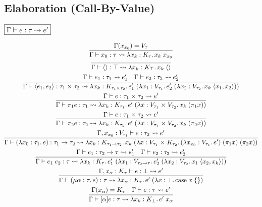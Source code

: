 \subsection{Elaboration (Call-By-Value)}

$\fbox{$\Gamma \vdash e: \tau \rightsquigarrow e'$}$

\begin{gather*}
  \infer{\Gamma \vdash x_0: \tau \elaborate \lambda x_k: K_\tau\ldotp x_k\; x_{x_0}}{
    \Gamma(x_{x_0}) = V_\tau
  }
  \\
  \infer{\Gamma \vdash \langle\rangle: \top \elaborate \lambda x_k: K_\top\ldotp x_k\; \langle\rangle}{}
  \\
  \infer{\Gamma \vdash \langle e_1, e_2\rangle: \tau_1 \multi \tau_2 \elaborate \lambda x_k: K_{\tau_1 \multi \tau_2}\ldotp e_1'\; (\lambda x_1: V_{\tau_1}\ldotp e_2'\; (\lambda x_2: V_{\tau_2}\ldotp x_k\; \langle x_1, x_2\rangle))}{
    \Gamma \vdash e_1: \tau_1 \elaborate e_1'
    &
    \Gamma \vdash e_2: \tau_2 \elaborate e_2'
  }
  \\
  \infer{\Gamma \vdash \pi_1 e: \tau_1 \elaborate \lambda x_k: K_{\tau_1}\ldotp e'\; (\lambda x: V_{\tau_1} \multi V_{\tau_2}\ldotp x_k\; (\pi_1 x))}{
    \Gamma \vdash e: \tau_1 \multi \tau_2 \elaborate e'
  }
  \\
  \infer{\Gamma \vdash \pi_2 e: \tau_2 \elaborate \lambda x_k: K_{\tau_2}\ldotp e'\; (\lambda x: V_{\tau_1} \multi V_{\tau_2}\ldotp x_k\; (\pi_2 x))}{
    \Gamma \vdash e: \tau_1 \multi \tau_2 \elaborate e'
  }
  \\
  \infer{\Gamma \vdash (\lambda x_0: \tau_1\ldotp e): \tau_1 \to \tau_2 \elaborate \lambda x_k: K_{\tau_1 \to \tau_2}\ldotp x_k\; (\lambda x: V_{\tau_1} \multi K_{\tau_2}\ldotp (\lambda x_{x_0}: V_{\tau_1}\ldotp e')\; (\pi_1 x)\; (\pi_2 x))}{
    \Gamma, x_{x_0}: V_{\tau_1} \vdash e: \tau_2 \elaborate e'
  }
  \\
  \infer{\Gamma \vdash e_1\; e_2: \tau \elaborate \lambda x_k: K_{\tau}\ldotp e_1'\; (\lambda x_1: V_{\tau_2 \to \tau}\ldotp e_2'\; (\lambda x_2: V_{\tau_2}\ldotp x_1\; \langle x_2, x_k\rangle))}{
    \Gamma \vdash e_1: \tau_2 \to \tau \elaborate e_1'
    &
    \Gamma \vdash e_2: \tau_2 \elaborate e_2'
  }
  \\
  \infer{\Gamma \vdash (\mu \alpha: \tau\ldotp e): \tau \elaborate \lambda x_\alpha: K_\tau\ldotp e'\; (\lambda x: \bot\ldotp \symcase x\; \{\})}{
    \Gamma, x_\alpha: K_\tau \vdash e: \bot \elaborate e'
  }
  \\
  \infer{\Gamma \vdash [\alpha] e: \tau \elaborate \lambda x_k: K_\bot\ldotp e'\; x_\alpha}{
    \Gamma(x_\alpha) = K_\tau
    &
    \Gamma \vdash e: \tau \elaborate e'
  }
\end{gather*}


